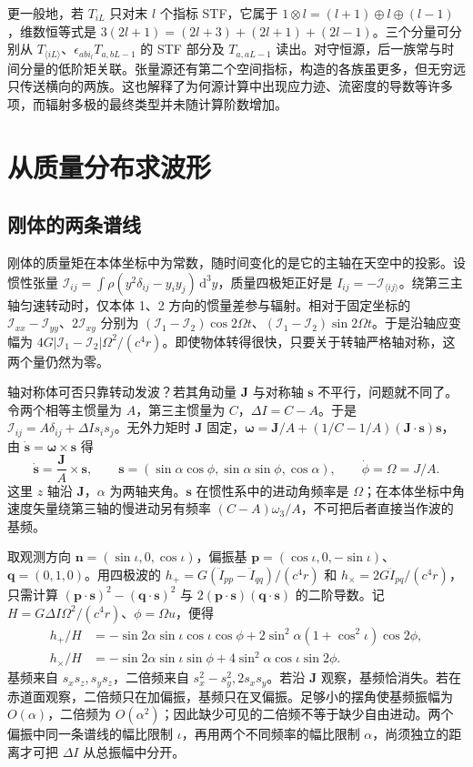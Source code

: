 更一般地，若 $T_{iL}$ 只对末 $l$ 个指标 STF，它属于 $1\otimes l=(l+1)\oplus l\oplus(l-1)$，维数恒等式是 $3(2l+1)=(2l+3)+(2l+1)+(2l-1)$。三个分量可分别从 $T_{\langle iL\rangle}$、$\epsilon_{abi_l}T_{a,bL-1}$ 的 STF 部分及 $T_{a,aL-1}$ 读出。对守恒源，后一族常与时间分量的低阶矩关联。张量源还有第二个空间指标，构造的各族虽更多，但无穷远只传送横向的两族。这也解释了为何源计算中出现应力迹、流密度的导数等许多项，而辐射多极的最终类型并未随计算阶数增加。

\section{从质量分布求波形}\label{sec:gw-a-sources}

\subsection{刚体的两条谱线}

刚体的质量矩在本体坐标中为常数，随时间变化的是它的主轴在天空中的投影。设惯性张量 $\mathcal I_{ij}=\int\rho(y^2\delta_{ij}-y_iy_j)\,\mathrm d^3y$，质量四极矩正好是 $I_{ij}=-\mathcal I_{\langle ij\rangle}$。绕第三主轴匀速转动时，仅本体 1、2 方向的惯量差参与辐射。相对于固定坐标的 $\mathcal I_{xx}-\mathcal I_{yy}$、$2\mathcal I_{xy}$ 分别为 $(\mathcal I_1-\mathcal I_2)\cos2\Omega t$、$(\mathcal I_1-\mathcal I_2)\sin2\Omega t$。于是沿轴应变幅为 $4G|\mathcal I_1-\mathcal I_2|\Omega^2/(c^4r)$。即使物体转得很快，只要关于转轴严格轴对称，这两个量仍然为零。

轴对称体可否只靠转动发波？若其角动量 $\bm J$ 与对称轴 $\bm s$ 不平行，问题就不同了。令两个相等主惯量为 $A$，第三主惯量为 $C$，$\Delta I=C-A$。于是 $\mathcal I_{ij}=A\delta_{ij}+\Delta I s_is_j$。无外力矩时 $\bm J$ 固定，$\bm\omega=\bm J/A+(1/C-1/A)(\bm J\cdot\bm s)\bm s$，由 $\dot{\bm s}=\bm\omega\times\bm s$ 得
\[
 \dot{\bm s}=\frac{\bm J}{A}\times\bm s,\qquad
 \bm s=(\sin\alpha\cos\phi,\sin\alpha\sin\phi,\cos\alpha),\qquad
 \dot\phi=\Omega=J/A .
\]
这里 $z$ 轴沿 $\bm J$，$\alpha$ 为两轴夹角。$\bm s$ 在惯性系中的进动角频率是 $\Omega$；在本体坐标中角速度矢量绕第三轴的慢进动另有频率 $(C-A)\omega_3/A$，不可把后者直接当作波的基频。

取观测方向 $\bm n=(\sin\iota,0,\cos\iota)$，偏振基 $\bm p=(\cos\iota,0,-\sin\iota)$、$\bm q=(0,1,0)$。用四极波的 $h_+=G(\ddot I_{pp}-\ddot I_{qq})/(c^4r)$ 和 $h_\times=2G\ddot I_{pq}/(c^4r)$，只需计算 $(\bm p\cdot\bm s)^2-(\bm q\cdot\bm s)^2$ 与 $2(\bm p\cdot\bm s)(\bm q\cdot\bm s)$ 的二阶导数。记 $H=G\Delta I\Omega^2/(c^4r)$、$\phi=\Omega u$，便得
\begin{align*}
 h_+/H&=-\sin2\alpha\sin\iota\cos\iota\cos\phi
        +2\sin^2\alpha(1+\cos^2\iota)\cos2\phi,\\
 h_\times/H&=-\sin2\alpha\sin\iota\sin\phi
        +4\sin^2\alpha\cos\iota\sin2\phi .
\end{align*}
基频来自 $s_xs_z,s_ys_z$，二倍频来自 $s_x^2-s_y^2,2s_xs_y$。若沿 $\bm J$ 观察，基频恰消失。若在赤道面观察，二倍频只在加偏振，基频只在叉偏振。足够小的摆角使基频振幅为 $O(\alpha)$，二倍频为 $O(\alpha^2)$；因此缺少可见的二倍频不等于缺少自由进动。两个偏振中同一条谱线的幅比限制 $\iota$，再用两个不同频率的幅比限制 $\alpha$，尚须独立的距离才可把 $\Delta I$ 从总振幅中分开。

